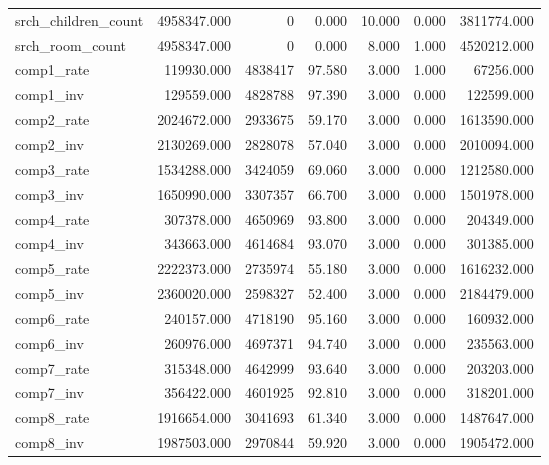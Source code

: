 \begin{longtable}{lrrrrrr}
srch\_children\_count & 4958347.000 & 0 & 0.000 & 10.000 & 0.000 & 3811774.000 \\
srch\_room\_count & 4958347.000 & 0 & 0.000 & 8.000 & 1.000 & 4520212.000 \\
comp1\_rate & 119930.000 & 4838417 & 97.580 & 3.000 & 1.000 & 67256.000 \\
comp1\_inv & 129559.000 & 4828788 & 97.390 & 3.000 & 0.000 & 122599.000 \\
comp2\_rate & 2024672.000 & 2933675 & 59.170 & 3.000 & 0.000 & 1613590.000 \\
comp2\_inv & 2130269.000 & 2828078 & 57.040 & 3.000 & 0.000 & 2010094.000 \\
comp3\_rate & 1534288.000 & 3424059 & 69.060 & 3.000 & 0.000 & 1212580.000 \\
comp3\_inv & 1650990.000 & 3307357 & 66.700 & 3.000 & 0.000 & 1501978.000 \\
comp4\_rate & 307378.000 & 4650969 & 93.800 & 3.000 & 0.000 & 204349.000 \\
comp4\_inv & 343663.000 & 4614684 & 93.070 & 3.000 & 0.000 & 301385.000 \\
comp5\_rate & 2222373.000 & 2735974 & 55.180 & 3.000 & 0.000 & 1616232.000 \\
comp5\_inv & 2360020.000 & 2598327 & 52.400 & 3.000 & 0.000 & 2184479.000 \\
comp6\_rate & 240157.000 & 4718190 & 95.160 & 3.000 & 0.000 & 160932.000 \\
comp6\_inv & 260976.000 & 4697371 & 94.740 & 3.000 & 0.000 & 235563.000 \\
comp7\_rate & 315348.000 & 4642999 & 93.640 & 3.000 & 0.000 & 203203.000 \\
comp7\_inv & 356422.000 & 4601925 & 92.810 & 3.000 & 0.000 & 318201.000 \\
comp8\_rate & 1916654.000 & 3041693 & 61.340 & 3.000 & 0.000 & 1487647.000 \\
comp8\_inv & 1987503.000 & 2970844 & 59.920 & 3.000 & 0.000 & 1905472.000 \\
\end{longtable}
